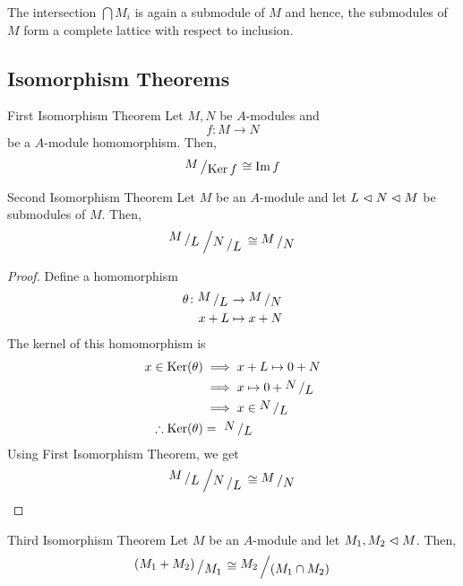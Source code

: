 \begin{note}
	The intersection \(\bigcap M_i\) is again a submodule of \(M\) and hence,
	the submodules of \(M\) form a complete lattice with
	respect to inclusion.
\end{note}


\subsection{Isomorphism Theorems}

\begin{theorem}{First Isomorphism Theorem}{}
	Let \(M, N\) be \(A\)-modules and
	\[
		f \colon M \to N
	\]
	be a \(A\)-module homomorphism.
	Then,
	\[
		\bigslant{M}{\Ker{f}} \cong \Img{f}
	\]
\end{theorem}

\begin{theorem}{Second Isomorphism Theorem}{}
	Let \(M\) be an \(A\)-module and let \( L \vartriangleleft N \vartriangleleft M\)
	be submodules of \(M\).
	Then,
	\[
		\bigslant{\bigslant{M}{L}}{\bigslant{N}{L}} \cong
		\bigslant{M}{N}
	\]
\end{theorem}

\begin{proof}
	Define a homomorphism
	\begin{align*}
		\theta \colon \bigslant{M}{L} &\to \bigslant{M}{N} \\
		x + L &\mapsto x + N
	\end{align*}
	The kernel of this homomorphism is
	\begin{align*}
		x \in \Ker(\theta) &\implies x + L \mapsto 0 + N \\
		&\implies x \mapsto 0 + \bigslant{N}{L} \\
		&\implies x \in \bigslant{N}{L} \\
		\therefore \Ker(\theta) &= \ \bigslant{N}{L}
	\end{align*}
	Using First Isomorphism Theorem, we get
	\[
		\bigslant{\bigslant{M}{L}}{\bigslant{N}{L}} \cong
		\bigslant{M}{N} \qedhere
	\]
\end{proof}


\begin{theorem}{Third Isomorphism Theorem}{}
	Let \(M\) be an \(A\)-module and let \( M_1, M_2 \vartriangleleft M\).
	Then,
	\[
		\bigslant{\brak{M_1 + M_2}}{M_1} \cong
		\bigslant{M_2}{\brak{M_1 \cap M_2}}
	\]
\end{theorem}

